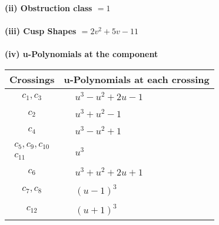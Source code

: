 \documentclass[1p]{elsarticle_modified}
\theoremstyle{definition}
\begin{document}
\flushleft \textbf{(ii) Obstruction class $= 1$}\\~\\
\flushleft \textbf{(iii) Cusp Shapes $= 2 v^2+5 v-11$}\\~\\
\newpage\renewcommand{\arraystretch}{1}
\flushleft \textbf{(iv) u-Polynomials at the component}\newline \\
\begin{tabular}{m{50pt}|m{274pt}}
Crossings & \hspace{64pt}u-Polynomials at each crossing \\
\hline $$\begin{aligned}c_{1},c_{3}\end{aligned}$$&$\begin{aligned}
&u^3- u^2+2 u-1
\end{aligned}$\\
\hline $$\begin{aligned}c_{2}\end{aligned}$$&$\begin{aligned}
&u^3+u^2-1
\end{aligned}$\\
\hline $$\begin{aligned}c_{4}\end{aligned}$$&$\begin{aligned}
&u^3- u^2+1
\end{aligned}$\\
\hline $$\begin{aligned}c_{5},c_{9},c_{10}\\c_{11}\end{aligned}$$&$\begin{aligned}
&u^3
\end{aligned}$\\
\hline $$\begin{aligned}c_{6}\end{aligned}$$&$\begin{aligned}
&u^3+u^2+2 u+1
\end{aligned}$\\
\hline $$\begin{aligned}c_{7},c_{8}\end{aligned}$$&$\begin{aligned}
&(u-1)^3
\end{aligned}$\\
\hline $$\begin{aligned}c_{12}\end{aligned}$$&$\begin{aligned}
&(u+1)^3
\end{aligned}$\\
\hline
\end{tabular}\\~\\
\end{document}
